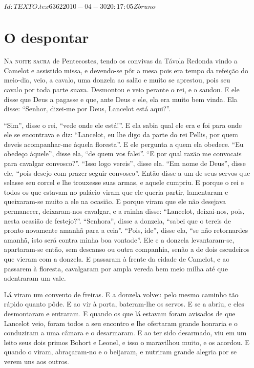 \SVN $Id: TEXTO.tex 6362 2010-04-30 20:17:05Z bruno $

\begin{comment}
TRADUÇÃO DA VERSÃO ALEMÃ DE \textit{A DEMANDA DO SANTO GRAAL} (Códice 147 da
\textit{Bibliotheca Palatina Germaniae}, de Heidelberg, fins do século XIII). 
\end{comment}

\chapter{O despontar} 

\textsc{Na noite sacra} de Pentecostes, tendo os convivas da Távola Redonda vindo a
Camelot e assistido missa, e devendo-se pôr a mesa pois era tempo da refeição do
meio-dia, veio, a cavalo, uma donzela ao salão e muito se aprestou, pois seu
cavalo por toda parte suava. Desmontou e veio perante o rei, e o saudou. E ele
disse que Deus a pagasse e que, ante Deus e ele, ela era muito bem vinda. Ela
disse: “Senhor, dizei-me por Deus, Lancelot está aqui?”.

“Sim”, disse o rei, “vede onde ele está!”. E ela sabia qual ele era e foi para
onde ele se encontrava e diz: “Lancelot, eu lhe digo da parte do rei Pellis,
por quem deveis acompanhar-me àquela floresta”. E ele pergunta a quem ela
obedece. “Eu obedeço àquele”, disse ela, “de quem vos falei”. “E por qual razão
me convocais para cavalgar convosco?”. “Isso logo vereis”, disse ela. “Em nome
de Deus”, disse ele, “pois desejo com prazer seguir convosco”. Então disse a um
de seus servos que selasse seu corcel e lhe trouxesse suas armas, e aquele
cumpriu. E porque o rei e todos os que estavam no palácio viram que ele queria
partir, lamentaram e queixaram-se muito a ele na ocasião. E porque viram que
ele não desejava permanecer, deixaram-nos cavalgar, e a rainha disse:
“Lancelot, deixai-nos, pois, nesta ocasião de festejo?”. “Senhora”, disse a
donzela, “sabei que o tereis de pronto novamente amanhã para a ceia”. “Pois,
ide”, disse ela, “se não retornardes amanhã, isto será contra minha boa
vontade”. Ele e a donzela levantaram-se, apartaram-se então, sem descanso ou
outra companhia, senão a de dois escudeiros que vieram com a donzela. E
passaram à frente da cidade de Camelot, e ao passarem à floresta, cavalgaram por
ampla vereda bem meio milha até que adentraram um vale.

Lá viram um convento de freiras. E a donzela volveu pelo mesmo caminho tão
rápido quanto pôde. E ao vir à porta, bateram-lhe os servos. E se a abriu, e
eles desmontaram e entraram. E quando os que lá estavam foram avisados de que
Lancelot veio, foram todos a seu encontro e lhe ofertaram grande honraria e o
conduziram a uma câmara e o desarmaram. E ao ter sido desarmado, viu em um
leito seus dois primos Bohort e Leonel, e isso o maravilhou muito, e os
acordou. E quando o viram, abraçaram-no e o beijaram, e nutriram grande alegria
por se verem uns aos outros. 


